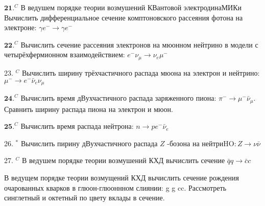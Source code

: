 \documentclass[a4paper,12pt]{article} %
\begin{document}
\begin{task}

$\mathbf{2 1 .}^{C}$ В ведушем порядке теории возмушений КВантовой электродинаМИКи Вычислить дифференциальное сечение комптоновского рассеяния фотона на электроне: $\gamma e^{-} \rightarrow \gamma e^{-}$


\end{task}



\begin{task}

$\mathbf{2 2 .}^{C}$ Вычислить сечение рассеяния электронов на мюонном нейтрино
в модели с четырёхфермионном взаимодействием: $e^{-} \nu_{\mu} \rightarrow \nu_{e} \mu^{-}$


\end{task}



\begin{task}

23. $^{C}$ Вычислить ширину трёхчастичного распада мюона на электрон и нейтрино: $\mu^{-} \rightarrow e^{-} \bar{\nu}_{e} \nu_{\mu}$


\end{task}



\begin{task}

$\mathbf{2 4 .}^{C}$ Вычислить время дВухчастичного распада заряженного пиона:
$\pi^{-} \rightarrow \mu^{-} \bar{\nu}_{\mu} .$ Сравнить ширину распада пиона на электрон и мюон.



\end{task}



\begin{task}

$\mathbf{2 5 .}^{C}$ Вычислить время распада нейтрона: $n \rightarrow p e^{-} \bar{\nu}_{e}$


\end{task}



\begin{task}

26. $^{*}$ Вычислить пирину дВухчастичного распада $Z$ -бозона на нейтри$\mathrm{HO}: Z \rightarrow \nu \bar{\nu}$


\end{task}



\begin{task}

27. $^{C}$ В ведушем порядке теории возмушений КХД вычислить сечение
$\bar{q} q \rightarrow \bar{c} c$


\end{task}



\begin{task}

В ведущем порядке теории возмущений КХД вычислить сечение рождения очарованных кварков в глюон-глюоннном слиянии: g g  cc. Рассмотреть синглетный и октетный по цвету вклады в сечение. 


\end{task}




\printindex



\end{document}

